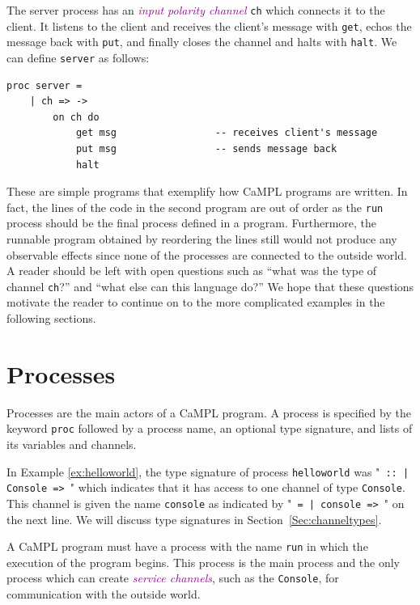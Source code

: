\documentclass[11pt]{article}
\newcommand{\tc}[1]{\textcolor{darkMagenta}{\textit{#1}}}
\begin{document}
The server process has an \tc{input polarity channel} \lstinline$ch$ which connects it to the client.
It listens to the client and receives the client's message with \lstinline$get$, echos the message back with \lstinline$put$, and finally closes the channel and halts with \lstinline$halt$.
We can define \lstinline$server$ as follows:
\begin{lstlisting}
proc server =
	| ch => ->
		on ch do
			get msg					-- receives client's message
			put msg					-- sends message back
			halt
\end{lstlisting}

These are simple programs that exemplify how CaMPL programs are written.
In fact, the lines of the code in the second program are out of order as the \lstinline$run$ process should be the final process defined in a program.
Furthermore, the runnable program obtained by reordering the lines still would not produce any observable effects since none of the processes are connected to the outside world.
A reader should be left with open questions such as ``what was the type of channel \lstinline$ch$?'' and ``what else can this language do?''
We hope that these questions motivate the reader to continue on to the more complicated examples in the following sections.


\section{Processes}
\label{Sec:Processes}

Processes are the main actors of a CaMPL program. %
A process is specified by the keyword \lstinline$proc$ followed by a process name, an optional type signature, and lists of its variables and channels.

In Example \ref{ex:helloworld}, the type signature of process \lstinline$helloworld$ was "\lstinline$ :: | Console => $" which indicates that it has access to one channel of type \lstinline$Console$.
This channel is given the name \lstinline$console$ as indicated by "\lstinline$ = | console => $" on the next line.
We will discuss type signatures in Section~\ref{Sec:channeltypes}.

A CaMPL program must have a process with the name \lstinline$run$ in which the execution of the program begins. This process is the main process and the only process which can create \tc{service channels}, such as the \lstinline$Console$, for communication with the outside world.
\end{document}
